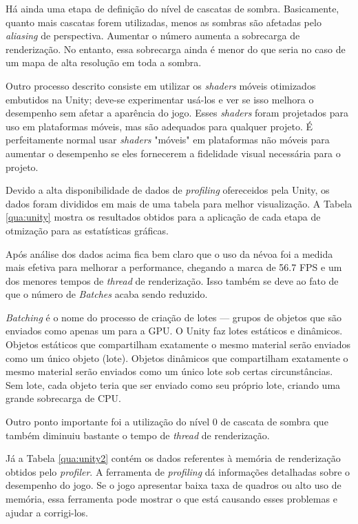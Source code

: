 Há ainda uma etapa de definição do nível de cascatas de sombra. Basicamente, quanto mais cascatas forem utilizadas, menos as sombras são afetadas pelo \textit{aliasing} de perspectiva. Aumentar o número aumenta a sobrecarga de renderização. No entanto, essa sobrecarga ainda é menor do que seria no caso de um mapa de alta resolução em toda a sombra.

Outro processo descrito consiste em utilizar os \textit{shaders} móveis otimizados embutidos na Unity; deve-se experimentar usá-los e ver se isso melhora o desempenho sem afetar a aparência do jogo. Esses \textit{shaders} foram projetados para uso em plataformas móveis, mas são adequados para qualquer projeto. É perfeitamente normal usar \textit{shaders} "móveis" em plataformas não móveis para aumentar o desempenho se eles fornecerem a fidelidade visual necessária para o projeto.

Devido a alta disponibilidade de dados de \textit{profiling} ofereceidos pela Unity, os dados foram divididos em mais de uma tabela para melhor visualização. A Tabela \ref{qua:unity} mostra os resultados obtidos para a aplicação de cada etapa de otmização para as estatísticas gráficas.



Após análise dos dados acima fica bem claro que o uso da névoa foi a medida mais efetiva para melhorar a performance, chegando a marca de 56.7 FPS e um dos menores tempos de \textit{thread} de renderização. Isso também se deve ao fato de que o número de \textit{Batches} acaba sendo reduzido.

\textit{Batching} é o nome do processo de criação de lotes --- grupos de objetos que são enviados como apenas um para a GPU. O Unity faz lotes estáticos e dinâmicos. Objetos estáticos que compartilham exatamente o mesmo material serão enviados como um único objeto (lote). Objetos dinâmicos que compartilham exatamente o mesmo material serão enviados como um único lote sob certas circunstâncias. Sem lote, cada objeto teria que ser enviado como seu próprio lote, criando uma grande sobrecarga de CPU.

Outro ponto importante foi a utilização do nível 0 de cascata de sombra que também diminuiu bastante o tempo de \textit{thread} de renderização.

Já a Tabela \ref{qua:unity2} contém os dados referentes à memória de renderização obtidos pelo \textit{profiler}. A ferramenta de \textit{profiling} dá informações detalhadas sobre o desempenho do jogo. Se o jogo apresentar baixa taxa de quadros ou alto uso de memória, essa ferramenta pode mostrar o que está causando esses problemas e ajudar a corrigi-los.

